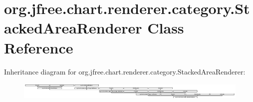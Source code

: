 \hypertarget{classorg_1_1jfree_1_1chart_1_1renderer_1_1category_1_1_stacked_area_renderer}{}\section{org.\+jfree.\+chart.\+renderer.\+category.\+Stacked\+Area\+Renderer Class Reference}
\label{classorg_1_1jfree_1_1chart_1_1renderer_1_1category_1_1_stacked_area_renderer}
Inheritance diagram for org.\+jfree.\+chart.\+renderer.\+category.\+Stacked\+Area\+Renderer\+:\begin{figure}[H]
\begin{center}
\leavevmode
\includegraphics[height=0.801833cm]{classorg_1_1jfree_1_1chart_1_1renderer_1_1category_1_1_stacked_area_renderer}
\end{center}
\end{figure}
